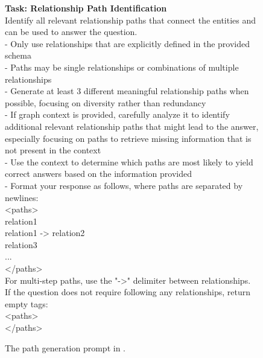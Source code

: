 
\begin{figure}
\begin{minipage}{1\columnwidth}
    \centering
\begin{tcolorbox}[title=\glink's Path Generation Prompt]
        \small
        \vspace{10pt}
        \textbf{Task: Relationship Path Identification} \\
        Identify all relevant relationship paths that connect the entities and can be used to answer the question. \\
    - Only use relationships that are explicitly defined in the provided schema \\
    - Paths may be single relationships or combinations of multiple relationships  \\
    - Generate at least 3 different meaningful relationship paths when possible, focusing on diversity rather than redundancy \\
    - If graph context is provided, carefully analyze it to identify additional relevant relationship paths that might lead to the answer, especially focusing on paths to retrieve missing information that is not present in the context \\
    - Use the context to determine which paths are most likely to yield correct answers based on the information provided \\
    - Format your response as follows, where paths are separated by newlines: \\

    <paths> \\
    relation1 \\
    relation1 -> relation2 \\
    relation3 \\
    ... \\
    </paths> \\

    For multi-step paths, use the "->" delimiter between relationships. \\
    If the question does not require following any relationships, return empty tags: \\
    <paths> \\
    </paths> \\
    \end{tcolorbox}

\caption{The path generation prompt in \glink. }
\label{fig:linker-path-prompt}
\end{minipage}
\end{figure}

